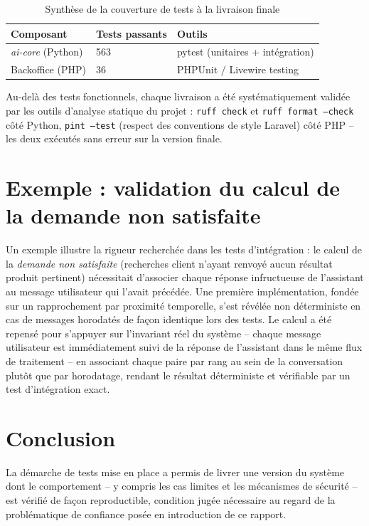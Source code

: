 \begin{table}[h]
\centering
\caption{Synthèse de la couverture de tests à la livraison finale}
\label{tab:tests-resultats}
\begin{tabular}{@{}p{5cm}p{3cm}p{6cm}@{}}
\toprule
\textbf{Composant} & \textbf{Tests passants} & \textbf{Outils} \\
\midrule
\emph{ai-core} (Python) & 563 & pytest (unitaires + intégration) \\
Backoffice (PHP) & 36 & PHPUnit / Livewire testing \\
\bottomrule
\end{tabular}
\end{table}

Au-delà des tests fonctionnels, chaque livraison a été systématiquement validée par les outils d'analyse statique du projet : \texttt{ruff check} et \texttt{ruff format --check} côté Python, \texttt{pint --test} (respect des conventions de style Laravel) côté PHP -- les deux exécutés sans erreur sur la version finale.

\section{Exemple : validation du calcul de la demande non satisfaite}

Un exemple illustre la rigueur recherchée dans les tests d'intégration : le calcul de la \emph{demande non satisfaite} (recherches client n'ayant renvoyé aucun résultat produit pertinent) nécessitait d'associer chaque réponse infructueuse de l'assistant au message utilisateur qui l'avait précédée. Une première implémentation, fondée sur un rapprochement par proximité temporelle, s'est révélée non déterministe en cas de messages horodatés de façon identique lors des tests. Le calcul a été repensé pour s'appuyer sur l'invariant réel du système -- chaque message utilisateur est immédiatement suivi de la réponse de l'assistant dans le même flux de traitement -- en associant chaque paire par rang au sein de la conversation plutôt que par horodatage, rendant le résultat déterministe et vérifiable par un test d'intégration exact.

\section*{Conclusion}

La démarche de tests mise en place a permis de livrer une version du système dont le comportement -- y compris les cas limites et les mécanismes de sécurité -- est vérifié de façon reproductible, condition jugée nécessaire au regard de la problématique de confiance posée en introduction de ce rapport.
